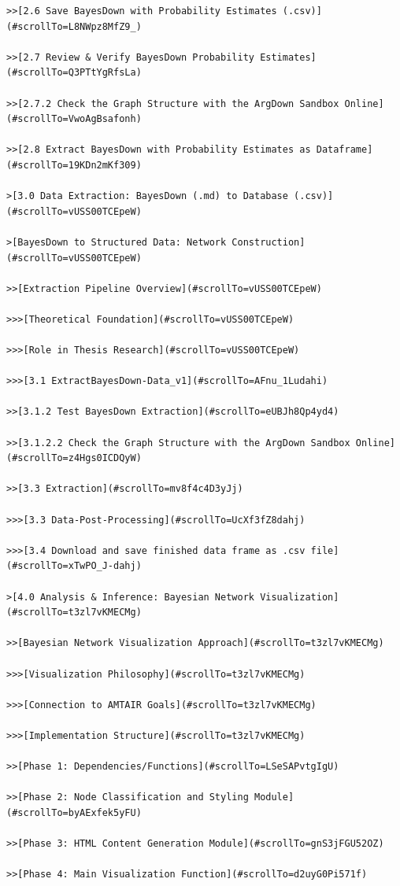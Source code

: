 \documentclass[
  11pt,
  letterpaper,
]{book}
\begin{document}
\begin{verbatim}
>>[2.6 Save BayesDown with Probability Estimates (.csv)](#scrollTo=L8NWpz8MfZ9_)

>>[2.7 Review & Verify BayesDown Probability Estimates](#scrollTo=Q3PTtYgRfsLa)

>>[2.7.2 Check the Graph Structure with the ArgDown Sandbox Online](#scrollTo=VwoAgBsafonh)

>>[2.8 Extract BayesDown with Probability Estimates as Dataframe](#scrollTo=19KDn2mKf309)

>[3.0 Data Extraction: BayesDown (.md) to Database (.csv)](#scrollTo=vUSS00TCEpeW)

>[BayesDown to Structured Data: Network Construction](#scrollTo=vUSS00TCEpeW)

>>[Extraction Pipeline Overview](#scrollTo=vUSS00TCEpeW)

>>>[Theoretical Foundation](#scrollTo=vUSS00TCEpeW)

>>>[Role in Thesis Research](#scrollTo=vUSS00TCEpeW)

>>>[3.1 ExtractBayesDown-Data_v1](#scrollTo=AFnu_1Ludahi)

>>[3.1.2 Test BayesDown Extraction](#scrollTo=eUBJh8Qp4yd4)

>>[3.1.2.2 Check the Graph Structure with the ArgDown Sandbox Online](#scrollTo=z4Hgs0ICDQyW)

>>[3.3 Extraction](#scrollTo=mv8f4c4D3yJj)

>>>[3.3 Data-Post-Processing](#scrollTo=UcXf3fZ8dahj)

>>>[3.4 Download and save finished data frame as .csv file](#scrollTo=xTwPO_J-dahj)

>[4.0 Analysis & Inference: Bayesian Network Visualization](#scrollTo=t3zl7vKMECMg)

>>[Bayesian Network Visualization Approach](#scrollTo=t3zl7vKMECMg)

>>>[Visualization Philosophy](#scrollTo=t3zl7vKMECMg)

>>>[Connection to AMTAIR Goals](#scrollTo=t3zl7vKMECMg)

>>>[Implementation Structure](#scrollTo=t3zl7vKMECMg)

>>[Phase 1: Dependencies/Functions](#scrollTo=LSeSAPvtgIgU)

>>[Phase 2: Node Classification and Styling Module](#scrollTo=byAExfek5yFU)

>>[Phase 3: HTML Content Generation Module](#scrollTo=gnS3jFGU52OZ)

>>[Phase 4: Main Visualization Function](#scrollTo=d2uyG0Pi571f)


\end{verbatim}
\end{document}
